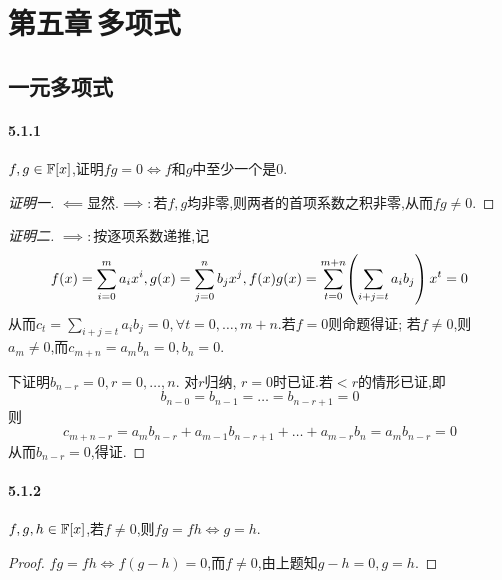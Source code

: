 \documentclass[11pt]{article}
\begin{document}

\newpage
\section{第五章\,多项式}
\subsection{一元多项式}
\paragraph{5.1.1}$f,g\in\mathbb{F}[x]$,证明$fg=0\iff f$和$g$中至少一个是0.
\begin{proof}[证明一]
    $\impliedby$显然.$\implies:$若$f,g$均非零,则两者的首项系数之积非零,从而$fg\neq 0$.
\end{proof}
\begin{proof}[证明二]
    $\implies:$按逐项系数递推,记
    $$f(x)=\sum_{i=0}^{m}a_ix^i, g(x)=\sum_{j=0}^{n}b_jx^j, f(x)g(x)=\sum_{t=0}^{m+n}\!\left(\sum_{i+j=t}a_ib_j\right)x^t=0$$
    从而$c_t=\sum_{i+j=t}a_ib_j=0, \forall t=0,\dots,m+n$.若$f=0$则命题得证; 若$f\neq 0$,则$a_m\neq 0$,而$c_{m+n}=a_mb_n=0, b_n=0$.

    下证明$b_{n-r}=0, r=0,\dots,n$. 对$r$归纳, $r=0$时已证.若$<r$的情形已证,即
    $$b_{n-0}=b_{n-1}=\dots=b_{n-r+1}=0$$
    则
    $$c_{m+n-r}=a_mb_{n-r}+a_{m-1}b_{n-r+1}+\dots+a_{m-r}b_{n}=a_mb_{n-r}=0$$
    从而$b_{n-r}=0$,得证.
\end{proof}
\paragraph{5.1.2}$f,g,h\in \mathbb{F}[x]$,若$f\neq 0$,则$fg=fh\iff g=h$.
\begin{proof}
    $fg=fh\iff f(g-h)=0$,而$f\neq 0$,由上题知$g-h=0, g=h$.
\end{proof}
\end{document}
